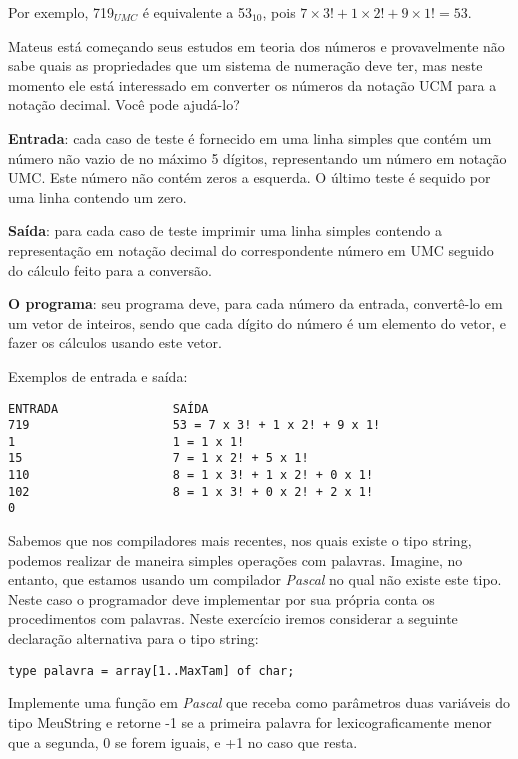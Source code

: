 Por exemplo, 719$_{UMC}$ é equivalente a 53$_{10}$, pois
$7 \times 3! + 1 \times 2! + 9 \times 1! = 53$.

Mateus está começando seus estudos em teoria dos números e 
provavelmente não sabe quais as propriedades que um sistema de numeração
deve ter, mas neste momento ele está interessado em converter
os números da notação UCM para a notação decimal. Você pode ajudá-lo?

\noindent
\textbf{Entrada}:
cada caso de teste é fornecido em uma linha simples que contém um 
número não vazio de no máximo 5 dígitos, representando um número 
em notação UMC. Este número não contém zeros a esquerda. O último
teste é sequido por uma linha contendo um zero.

\noindent
\textbf{Saída}:
para cada caso de teste imprimir uma linha simples contendo a representação
em notação decimal do correspondente número em UMC seguido do cálculo feito
para a conversão.

\noindent
\textbf{O programa}:
seu programa deve, para cada número da entrada, convertê-lo em um vetor
de inteiros, sendo que cada dígito do número é um elemento do vetor,
e fazer os cálculos usando este vetor. 

\noindent
Exemplos de entrada e saída:
\begin{verbatim}
ENTRADA                SAÍDA
719                    53 = 7 x 3! + 1 x 2! + 9 x 1!
1                      1 = 1 x 1!
15                     7 = 1 x 2! + 5 x 1!
110                    8 = 1 x 3! + 1 x 2! + 0 x 1!
102                    8 = 1 x 3! + 0 x 2! + 2 x 1!
0 
\end{verbatim}


\item Sabemos que nos compiladores  mais recentes, nos
  quais existe o tipo \textsf{string}, podemos realizar de maneira simples
   operações com  palavras.  Imagine, no entanto, que  estamos usando um
  compilador  \emph{Pascal}  no  qual  não  existe  este  tipo.  Neste  caso  o
  programador deve  implementar por  sua própria conta  os procedimentos
  com palavras. Neste exercício iremos considerar a seguinte 
  declaração alternativa para o tipo \textsf{string}: \\
\begin{center}
\verb+type palavra = array[1..MaxTam] of char;+ 
\end{center}
  Implemente uma função em \emph{Pascal} que receba
  como parâmetros duas variáveis do tipo \textsf{MeuString} e retorne -1 se a
  primeira palavra for lexicograficamente menor que a segunda, 0 se
  forem iguais, e +1 no caso que resta.



